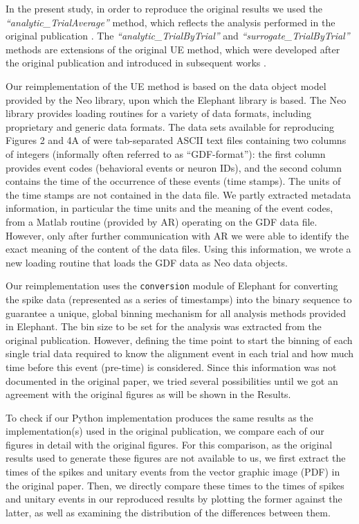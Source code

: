 \documentclass[10pt,a4paper,onecolumn]{article}
\begin{document}
In the present study, in order to reproduce the original results we used
the \emph{``analytic\_TrialAverage''} method, which reflects the
analysis performed in the original publication \autocite{Riehle97}. The
\emph{``analytic\_TrialByTrial''} and \emph{``surrogate\_TrialByTrial''}
methods are extensions of the original UE method, which were developed
after the original publication and introduced in subsequent works
\autocites{Gruen03b}{Gruen09}.

Our reimplementation of the UE method is based on the data object model
provided by the Neo library, upon which the Elephant library is based.
The Neo library provides loading routines for a variety of data formats,
including proprietary and generic data formats. The data sets available
for reproducing Figures 2 and 4A of \autocite{Riehle97} were
tab-separated ASCII text files containing two columns of integers
(informally often referred to as ``GDF-format''): the first column
provides event codes (behavioral events or neuron IDs), and the second
column contains the time of the occurrence of these events (time
stamps). The units of the time stamps are not contained in the data
file. We partly extracted metadata information, in particular the time
units and the meaning of the event codes, from a Matlab routine
(provided by AR) operating on the GDF data file. However, only after
further communication with AR we were able to identify the exact meaning
of the content of the data files. Using this information, we wrote a new
loading routine that loads the GDF data as Neo data objects.

Our reimplementation uses the \texttt{conversion} module of Elephant for
converting the spike data (represented as a series of timestamps) into
the binary sequence to guarantee a unique, global binning mechanism for
all analysis methods provided in Elephant. The bin size to be set for
the analysis was extracted from the original publication. However,
defining the time point to start the binning of each single trial data
required to know the alignment event in each trial and how much time
before this event (pre-time) is considered. Since this information was
not documented in the original paper, we tried several possibilities
until we got an agreement with the original figures as will be shown in
the Results.

To check if our Python implementation produces the same results as the
implementation(s) used in the original publication, we compare each of
our figures in detail with the original figures. For this comparison, as
the original results used to generate these figures are not available to
us, we first extract the times of the spikes and unitary events from the
vector graphic image (PDF) in the original paper. Then, we directly
compare these times to the times of spikes and unitary events in our
reproduced results by plotting the former against the latter, as well as
examining the distribution of the differences between them.
\end{document}
